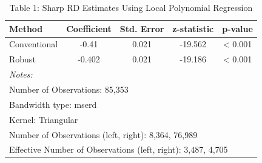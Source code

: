 \begin{table}[!htbp] \centering
  \caption{Table 1: Sharp RD Estimates Using Local Polynomial Regression}
  \label{tab:sharp_rd}
\begin{tabular}{lcccc}
\hline\hline
Method & Coefficient & Std. Error & z-statistic & p-value \\
\hline
Conventional & -0.41 & 0.021 & -19.562 & < 0.001 \\
Robust & -0.402 & 0.021 & -19.186 & < 0.001 \\
\hline
\multicolumn{5}{l}{\textit{Notes:}} \\
\multicolumn{5}{l}{Number of Observations: 85,353} \\
\multicolumn{5}{l}{Bandwidth type: mserd} \\
\multicolumn{5}{l}{Kernel: Triangular} \\
\multicolumn{5}{l}{Number of Observations (left, right): 8,364, 76,989} \\
\multicolumn{5}{l}{Effective Number of Observations (left, right): 3,487, 4,705} \\
\hline\hline
\end{tabular}
\end{table}
